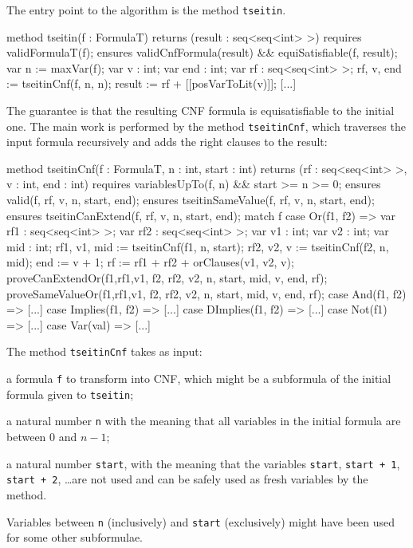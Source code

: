 \documentclass[12pt]{report}
\begin{document}
The entry point to the algorithm is the method \texttt{tseitin}.

\begin{dafny}
method tseitin(f : FormulaT) returns (result : seq<seq<int> >)
  requires validFormulaT(f);
  ensures validCnfFormula(result) && equiSatisfiable(f, result);
{ var n := maxVar(f); var v : int; var end : int; var rf : seq<seq<int> >;
  rf, v, end := tseitinCnf(f, n, n);
  result := rf + [[posVarToLit(v)]]; [...] }
\end{dafny}

The guarantee is that the resulting CNF formula is equisatisfiable to the
initial one. The main work is performed by the method
\texttt{tseitinCnf}, which traverses the input formula recursively and
adds the right clauses to the result:

\begin{dafny}
method tseitinCnf(f : FormulaT, n : int, start : int)
  returns (rf : seq<seq<int> >, v : int, end : int)
  requires variablesUpTo(f, n) && start >= n >= 0;
  ensures valid(f, rf, v, n, start, end);
  ensures tseitinSameValue(f, rf, v, n, start, end);
  ensures tseitinCanExtend(f, rf, v, n, start, end);
{ match f {
    case Or(f1, f2)        => {
      var rf1 : seq<seq<int> >; var rf2 : seq<seq<int> >;
      var v1 : int; var v2 : int;
      var mid : int;
      rf1, v1, mid := tseitinCnf(f1, n, start);
      rf2, v2, v := tseitinCnf(f2, n, mid);
      end := v + 1;
      rf := rf1 + rf2 + orClauses(v1, v2, v);
      proveCanExtendOr(f1,rf1,v1, f2, rf2, v2, n, start, mid, v, end, rf);
      proveSameValueOr(f1,rf1,v1, f2, rf2, v2, n, start, mid, v, end, rf);
    }
    case And(f1, f2)      => [...]  case Implies(f1, f2)  => [...]
    case DImplies(f1, f2) => [...]  case Not(f1) => [...]
    case Var(val) => [...]
} }
\end{dafny}

The method \texttt{tseitinCnf} takes as input:
%
\begin{enumerate*}
%
\item a formula \texttt{f} to transform into CNF, which might be a
  subformula of the initial formula given to \texttt{tseitin};
%
\item a natural number \texttt{n} with the meaning that all variables
  in the initial formula are between \( 0 \) and \( n - 1 \);
%
\item a natural number \texttt{start}, with the meaning that the
  variables \texttt{start}, \texttt{start + 1}, \texttt{start + 2},
  \ldots are not used and can be safely used as fresh variables by the
  method.
%
\end{enumerate*}
%
Variables between \texttt{n} (inclusively) and \texttt{start}
(exclusively) might have been used for some other subformulae.
\end{document}
